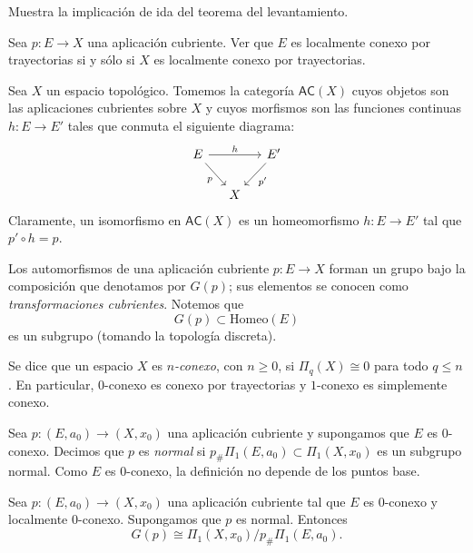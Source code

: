 \begin{ejercicio}
    Muestra la implicación de ida del teorema del levantamiento.
\end{ejercicio}
\begin{ejercicio}
Sea $p \colon E \to X$ una aplicación cubriente. Ver que $E$ es localmente conexo por trayectorias si y sólo si $X$ es localmente conexo por trayectorias.
\end{ejercicio}

\begin{definicion}
Sea $X$ un espacio topológico. Tomemos la categoría $\textsf{AC}(X)$ cuyos objetos son las aplicaciones cubrientes sobre $X$ y cuyos morfismos son las funciones continuas $h \colon E \to E'$ tales que conmuta el siguiente diagrama:
\[
\begin{tikzcd}[column sep=small]
E \arrow[rr, "h"] \arrow[dr, "p"'] & & E' \arrow[dl, "p'"] \\
& X &
\end{tikzcd}
\]
Claramente, un isomorfismo en $\textsf{AC}(X)$ es un homeomorfismo $h \colon E \to E'$ tal que $p' \circ h = p$.

Los automorfismos de una aplicación cubriente $p \colon E \to X$ forman un grupo bajo la composición que denotamos por $G(p)$; sus elementos se conocen como \textit{transformaciones cubrientes}. Notemos que
\[
G(p) \subset \mathrm{Homeo}(E)
\]
es un subgrupo (tomando la topología discreta).
\end{definicion}

\begin{definicion}
Se dice que un espacio $X$ es \textit{$n$-conexo}, con $n \geq 0$, si $\Pi_q(X) \cong 0$ para todo $q \leq n$. En particular, $0$-conexo es conexo por trayectorias y $1$-conexo es simplemente conexo.
\end{definicion}

\begin{definicion}
Sea $p \colon (E, a_0) \to (X, x_0)$ una aplicación cubriente y supongamos que $E$ es $0$-conexo. Decimos que $p$ es \textit{normal} si $p_{\#}\Pi_1(E, a_0) \subset \Pi_1(X, x_0)$ es un subgrupo normal. Como $E$ es $0$-conexo, la definición no depende de los puntos base.
\end{definicion}

\begin{prop}
\label{prop:G(p) cong Pi_1(X) / p Pi(E)}
Sea $p \colon (E, a_0) \to (X, x_0)$ una aplicación cubriente tal que $E$ es $0$-conexo y localmente $0$-conexo. Supongamos que $p$ es normal. Entonces
\[
G(p) \cong \Pi_1(X, x_0) / p_{\#}\Pi_1(E, a_0).
\]
\end{prop}

